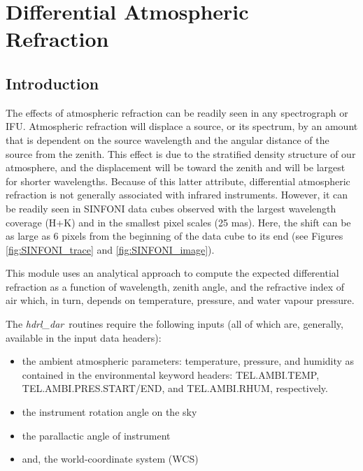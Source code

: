 \section{Differential Atmospheric Refraction}
\label{chap:DAR}

\def\hdrldar{{\em hdrl\_dar}}
\def\hdrlcat{{\em hdrl\_catalogue}}
\def\hdrlstrehl{{\em hdrl\_strehl}}



\subsection{Introduction}

The effects of atmospheric refraction can be readily seen in any spectrograph or IFU. Atmospheric refraction will displace a source, or its spectrum, 
by an amount that is dependent on the source wavelength and the angular distance of the source from the zenith.  
This effect is due to the stratified density structure of our atmosphere, and the displacement will be toward the zenith and will be largest for shorter wavelengths.
Because of this latter attribute, differential atmospheric refraction is not generally associated with infrared instruments. However, it can be 
readily seen in SINFONI data cubes observed with the largest wavelength coverage (H+K) and in the smallest pixel scales (25 mas). 
Here, the shift can be as large as 6 pixels from the beginning of the data cube to its end (see Figures \ref{fig:SINFONI_trace} and \ref{fig:SINFONI_image}).

This module uses an analytical approach to compute the expected differential refraction as a function of wavelength, zenith angle, and the refractive index of air
which, in turn, depends on temperature, pressure, and water vapour pressure.

The \hdrldar\ routines require the following inputs (all of which are, generally, available in the input data headers):
\begin{itemize}
\item the ambient atmospheric parameters: temperature, pressure, and humidity as contained in the environmental keyword headers:
TEL.AMBI.TEMP, TEL.AMBI.PRES.START/END, and TEL.AMBI.RHUM, respectively.
\item the instrument rotation angle on the sky
\item the parallactic angle of instrument
\item and, the world-coordinate system (WCS)
\end{itemize}


